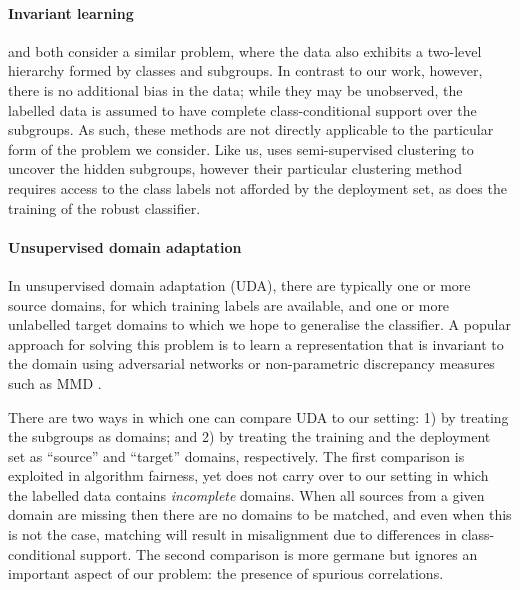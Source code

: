 \paragraph{Invariant learning}
\citet{SohDunAngGuetal20} and \citet{creager2021environment} both consider a similar problem, where
the data also exhibits a two-level hierarchy formed by classes and subgroups.
%
In contrast to our work, however, there is no additional bias in the data; while they may be
unobserved, the labelled data is assumed to have complete class-conditional support over the
subgroups.
%
As such, these methods are not directly applicable to the particular form of the problem we
consider.
%
Like us, \citet{SohDunAngGuetal20} uses semi-supervised clustering to uncover the hidden subgroups,
however their particular clustering method requires access to the class labels not afforded by the
deployment set, as does the training of the robust classifier.

\paragraph{Unsupervised domain adaptation}
In unsupervised domain adaptation (UDA), there are typically one or more source domains, for which
training labels are available, and one or more unlabelled target domains to which we hope to
generalise the classifier.
%
A popular approach for solving this problem is to learn a representation that is invariant to the
domain using adversarial networks \citep{ganin2016domain} or non-parametric discrepancy measures
such as \ac{MMD} \citep{gretton2012kernel}.
%

There are two ways in which one can compare UDA to our setting: 1) by treating the subgroups as
domains; and 2) by treating the training and the deployment set as ``source'' and ``target''
domains, respectively.
%
The first comparison is exploited in algorithm fairness, yet does not carry over to our setting in
which the labelled data contains \emph{incomplete} domains. 
%
When all sources from a given domain are missing then there are no domains to be matched, and even
when this is not the case, matching will result in misalignment due to differences in
class-conditional support.
%
The second comparison is more germane but ignores an important aspect of our problem: the presence
of spurious correlations.
%

